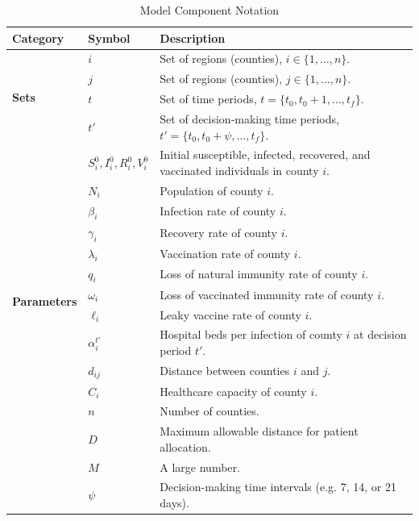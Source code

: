 \documentclass{article}
\begin{document}
\begin{table}[h]
    \caption{Model Component Notation}
    \label{tab:modelNotation}
    \centering
    \renewcommand{\arraystretch}{1.2}
    \begin{tabular}{|p{}|p{}|p{}|}
        \hline
        \textbf{Category} & \textbf{Symbol} & \textbf{Description} \\
        \hline
        \multirow{4}{*}{\textbf{Sets}} 
        & $i$ & Set of regions (counties), $i \in \{1, \ldots, n\}$. \\
        & $j$ & Set of regions (counties), $j \in \{1, \ldots, n\}$. \\
        & $t$ & Set of time periods, $t = \{ t_0, t_0 + 1, \ldots, t_f \}$. \\
        & $t'$ & Set of decision-making time periods, $t' = \{ t_0, t_0 + \psi, \ldots, t_f \}$. \\
        \hline
        \multirow{13}{*}{\textbf{Parameters}} 
        & $S_i^0, I_i^0, R_i^0, V_i^0$ & Initial susceptible, infected, recovered, and vaccinated individuals in county $i$. \\
        & $N_i$ & Population of county $i$. \\
        & $\beta_i$ & Infection rate of county $i$. \\
        & $\gamma_i$ & Recovery rate of county $i$. \\
        & $\lambda_i$ & Vaccination rate of county $i$. \\
        & $q_i$ & Loss of natural immunity rate of county $i$. \\
        & $\omega_i$ & Loss of vaccinated immunity rate of county $i$. \\
        & $\ell_i$ & Leaky vaccine rate of county $i$. \\
        & $\alpha_i^{t'}$ & Hospital beds per infection of county $i$ at decision period $t'$. \\
        & $d_{ij}$ & Distance between counties $i$ and $j$. \\
        & $C_i$ & Healthcare capacity of county $i$. \\
        & $n$ & Number of counties. \\
        & $D$ & Maximum allowable distance for patient allocation. \\
        & $M$ & A large number. \\
        & $\psi$ & Decision-making time intervals (e.g. 7, 14, or 21 days). \\

\end{tabular}
\end{table}
\end{document}
